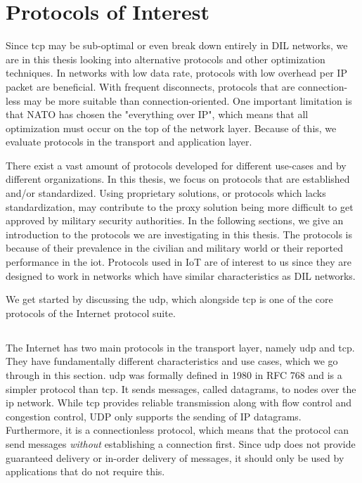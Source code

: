 \section{Protocols of Interest}

Since \gls{tcp} may be sub-optimal or even break down entirely in DIL networks,
we are in this thesis looking into alternative protocols and other optimization
techniques. In networks with low data rate, protocols with low overhead per IP
packet are beneficial. With frequent disconnects, protocols that are
connection-less may be more suitable than connection-oriented. One important
limitation is that NATO has chosen the "everything over IP", which means that
all optimization must occur on the top of the network layer. Because of this, we
evaluate protocols in the transport and application layer.

There exist a vast amount of protocols developed for different use-cases and by
different organizations. In this thesis, we focus on protocols that are
established and/or standardized. Using proprietary solutions, or protocols which
lacks standardization, may contribute to the proxy solution being more difficult
to get approved by military security authorities. In the following sections, we
give an introduction to the protocols we are investigating in this thesis. The
protocols is because of their prevalence in the civilian and military world or
their reported performance in the \gls{iot}. Protocols used in IoT are of
interest to us since they are designed to work in networks which have similar
characteristics as DIL networks.

We get started by discussing the \gls{udp}, which alongside \gls{tcp} is one of
the core protocols of the Internet protocol suite.


\subsection{}

The Internet has two main protocols in the transport layer, namely \gls{udp} and
\gls{tcp}. They have fundamentally different characteristics and use cases,
which we go through in this section. \gls{udp} was formally defined in 1980 in
RFC 768\cite{rfc-udp} and is a simpler protocol than \gls{tcp}. It sends
messages, called datagrams, to nodes over the \gls{ip} network. While \gls{tcp}
provides reliable transmission along with flow control and congestion control,
UDP only supports the sending of IP datagrams. Furthermore, it is a
connectionless protocol, which means that the protocol can send messages
\textit{without} establishing a connection first. Since \gls{udp} does not
provide guaranteed delivery or in-order delivery of messages, it should only be
used by applications that do not require this.

